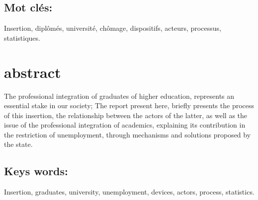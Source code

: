 \pagestyle{empty}
\lhead{}


\vspace*{10px}
	
\subsection*{Mot clés:}
Insertion, diplômés, université, chômage, dispositifs, acteurs, processus, statistiques.

\vspace{20px}
\section*{abstract}
	The professional integration of graduates of higher education, represents an essential stake in our society; The report present here, briefly presents the process of this insertion, the relationship between the actors of the latter, as well as the issue of the professional integration of academics, explaining its contribution in the restriction of unemployment, through mechanisms and solutions proposed by the state.

\subsection*{Keys words:}
Insertion, graduates, university, unemployment, devices, actors, process, statistics.
	
	
	